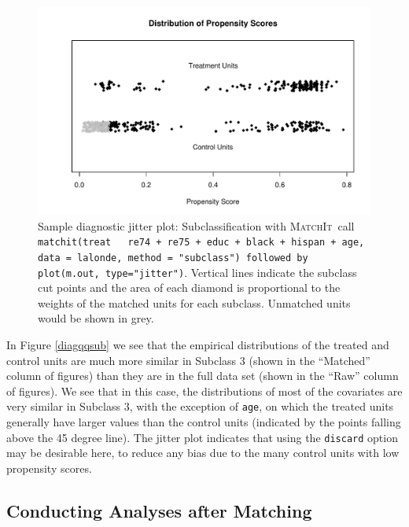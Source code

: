 \documentclass[oneside,letterpaper,titlepage]{article}
\newcommand{\MatchIt}{\textsc{MatchIt}}
\begin{document}
\begin{figure}[tbp]
  \begin{center}
\includegraphics{figs/docs-036}
    \hfill
    \caption{Sample diagnostic jitter plot: Subclassification with
      \MatchIt\ call \texttt{matchit(treat ~ re74 + re75 + educ +
        black + hispan + age, data = lalonde, method = "subclass")
        followed by plot(m.out, type="jitter")}.  Vertical lines
      indicate the subclass cut points and the area of each diamond is
      proportional to the weights of the matched units for each
      subclass.  Unmatched units would be shown in grey.}
    \label{diagjittersub}
  \end{center}
\end{figure}

In Figure \ref{diagqqsub} we see that the empirical distributions of
the treated and control units are much more similar in Subclass 3
(shown in the ``Matched'' column of figures) than they are in the full
data set (shown in the ``Raw'' column of figures).  We see that in
this case, the distributions of most of the covariates are very
similar in Subclass 3, with the exception of \texttt{age}, on
which the treated units generally have larger values than the control
units (indicated by the points falling above the 45 degree line).  The
jitter plot indicates that using the \texttt{discard} option may be
desirable here, to reduce any bias due to the many control units with
low propensity scores.


\subsection{Conducting Analyses after Matching}
\label{subsec:analysis}
\end{document}

